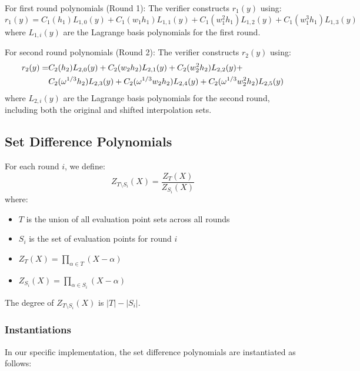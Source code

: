 \documentclass[12pt,a4paper]{article}
\begin{document}
For first round polynomials (Round 1):
The verifier constructs $r_1(y)$ using:
\begin{equation}
r_1(y) = C_1(h_1)L_{1,0}(y) + C_1(w_1h_1)L_{1,1}(y) + C_1(w_1^2h_1)L_{1,2}(y) + C_1(w_1^3h_1)L_{1,3}(y)
\end{equation}
where $L_{1,i}(y)$ are the Lagrange basis polynomials for the first round.

For second round polynomials (Round 2):
The verifier constructs $r_2(y)$ using:
\begin{align}
r_2(y) = & C_2(h_2)L_{2,0}(y) + C_2(w_2h_2)L_{2,1}(y) + C_2(w_2^2h_2)L_{2,2}(y) + \notag \\
         & C_2(\omega^{1/3}h_2)L_{2,3}(y) + C_2(\omega^{1/3}w_2h_2)L_{2,4}(y) + C_2(\omega^{1/3}w_2^2h_2)L_{2,5}(y)
\end{align}
where $L_{2,i}(y)$ are the Lagrange basis polynomials for the second round, including both the original and shifted interpolation sets.

\subsection{Set Difference Polynomials}
For each round $i$, we define:
\begin{equation}
Z_{T\setminus S_i}(X) = \frac{Z_T(X)}{Z_{S_i}(X)}
\end{equation}
where:
\begin{itemize}
\item $T$ is the union of all evaluation point sets across all rounds
\item $S_i$ is the set of evaluation points for round $i$
\item $Z_T(X) = \prod_{\alpha \in T} (X - \alpha)$
\item $Z_{S_i}(X) = \prod_{\alpha \in S_i} (X - \alpha)$
\end{itemize}
The degree of $Z_{T\setminus S_i}(X)$ is $|T| - |S_i|$.
\subsubsection{Instantiations}
In our specific implementation, the set difference polynomials are instantiated as follows:
\end{document}
